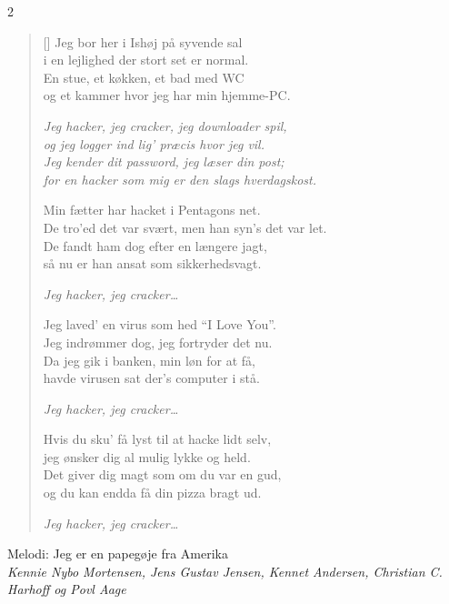 \begin{multicols}2
\settowidth{\versewidth}{og et kammer hvor jeg har min hjemme-PC}
\begin{verse}[\versewidth]
Jeg bor her i Ishøj på syvende sal\\
i en lejlighed der stort set er normal.\\
En stue, et køkken, et bad med WC\\
og et kammer hvor jeg har min hjemme-PC.

\emph{Jeg hacker, jeg cracker, jeg downloader spil,\\
og jeg logger ind lig' præcis hvor jeg vil.\\
Jeg kender dit password, jeg læser din post;\\
for en hacker som mig er den slags hverdagskost.}

Min fætter har hacket i Pentagons net.\\
De tro'ed det var svært, men han syn's det var let.\\
De fandt ham dog efter en længere jagt,\\
så nu er han ansat som sikkerhedsvagt.

\emph{Jeg hacker, jeg cracker\ldots}

Jeg laved' en virus som hed ``I Love You''.\\
Jeg indrømmer dog, jeg fortryder det nu.\\
Da jeg gik i banken, min løn for at få,\\
havde virusen sat der's computer i stå.

\emph{Jeg hacker, jeg cracker\ldots}

Hvis du sku' få lyst til at hacke lidt selv,\\
jeg ønsker dig al mulig lykke og held.\\
Det giver dig magt som om du var en gud,\\
og du kan endda få din pizza bragt ud.

\emph{Jeg hacker, jeg cracker\ldots}
\end{verse}
\end{multicols}


\newpage


{Melodi: Jeg er en papegøje fra Amerika}\\[.2em]
{\small\itshape Kennie Nybo Mortensen, Jens Gustav Jensen, Kennet Andersen, Christian C. Harhoff og Povl Aage}


